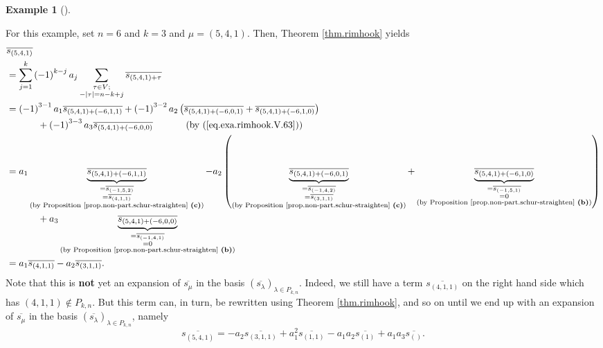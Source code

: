 \documentclass[numbers=enddot,12pt,final,onecolumn,notitlepage]{scrartcl}%
\theoremstyle{definition}
\newtheorem{exmp}[theo]{Example}
\newenvironment{example}[1][]
{\begin{exmp}[#1]\begin{leftbar}}
{\end{leftbar}\end{exmp}}
\let\sumnonlimits\sum
\renewcommand{\sum}{\sumnonlimits\limits}
\begin{document}
\begin{example}
For this example, set $n=6$ and $k=3$ and $\mu=\left(  5,4,1\right)  $. Then,
Theorem \ref{thm.rimhook} yields%
\begin{align*}
&  \overline{s_{\left(  5,4,1\right)  }}\\
&  =\sum_{j=1}^{k}\left(  -1\right)  ^{k-j}a_{j}\sum_{\substack{\tau\in
V;\\-\left\vert \tau\right\vert =n-k+j}}\overline{s_{\left(  5,4,1\right)
+\tau}}\\
&  =\left(  -1\right)  ^{3-1}a_{1}\overline{s_{\left(  5,4,1\right)  +\left(
-6,1,1\right)  }}+\left(  -1\right)  ^{3-2}a_{2}\left(  \overline{s_{\left(
5,4,1\right)  +\left(  -6,0,1\right)  }}+\overline{s_{\left(  5,4,1\right)
+\left(  -6,1,0\right)  }}\right) \\
&  \ \ \ \ \ \ \ \ \ \ +\left(  -1\right)  ^{3-3}a_{3}\overline{s_{\left(
5,4,1\right)  +\left(  -6,0,0\right)  }}\ \ \ \ \ \ \ \ \ \ \left(  \text{by
(\ref{eq.exa.rimhook.V.63})}\right) \\
&  =a_{1}\underbrace{\overline{s_{\left(  5,4,1\right)  +\left(
-6,1,1\right)  }}}_{\substack{=\overline{s_{\left(  -1,5,2\right)  }%
}\\=\overline{s_{\left(  4,1,1\right)  }}\\\text{(by Proposition
\ref{prop.non-part.schur-straighten} \textbf{(c)})}}}-a_{2}\left(
\underbrace{\overline{s_{\left(  5,4,1\right)  +\left(  -6,0,1\right)  }}%
}_{\substack{=\overline{s_{\left(  -1,4,2\right)  }}\\=\overline{s_{\left(
3,1,1\right)  }}\\\text{(by Proposition \ref{prop.non-part.schur-straighten}
\textbf{(c)})}}}+\underbrace{\overline{s_{\left(  5,4,1\right)  +\left(
-6,1,0\right)  }}}_{\substack{=\overline{s_{\left(  -1,5,1\right)  }%
}\\=0\\\text{(by Proposition \ref{prop.non-part.schur-straighten}
\textbf{(b)})}}}\right) \\
&  \ \ \ \ \ \ \ \ \ \ +a_{3}\underbrace{\overline{s_{\left(  5,4,1\right)
+\left(  -6,0,0\right)  }}}_{\substack{=\overline{s_{\left(  -1,4,1\right)  }%
}\\=0\\\text{(by Proposition \ref{prop.non-part.schur-straighten}
\textbf{(b)})}}}\\
&  =a_{1}\overline{s_{\left(  4,1,1\right)  }}-a_{2}\overline{s_{\left(
3,1,1\right)  }}.
\end{align*}
Note that this is \textbf{not} yet an expansion of $\overline{s_{\mu}}$ in the
basis $\left(  \overline{s_{\lambda}}\right)  _{\lambda\in P_{k,n}}$. Indeed,
we still have a term $\overline{s_{\left(  4,1,1\right)  }}$ on the right hand
side which has $\left(  4,1,1\right)  \notin P_{k,n}$. But this term can, in
turn, be rewritten using Theorem \ref{thm.rimhook}, and so on until we end up
with an expansion of $\overline{s_{\mu}}$ in the basis $\left(  \overline
{s_{\lambda}}\right)  _{\lambda\in P_{k,n}}$, namely%
\[
\overline{s_{\left(  5,4,1\right)  }}=-a_{2}\overline{s_{\left(  3,1,1\right)
}}+a_{1}^{2}\overline{s_{\left(  1,1\right)  }}-a_{1}a_{2}\overline{s_{\left(
1\right)  }}+a_{1}a_{3}\overline{s_{\left(  {}\right)  }}.
\]


\end{example}
\end{document}
